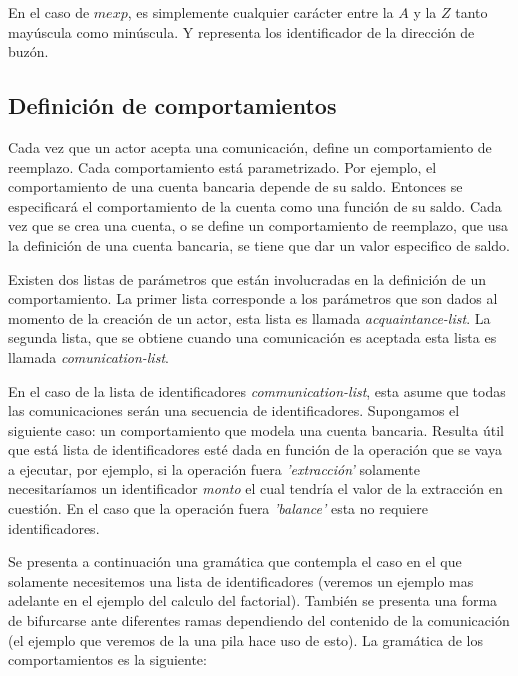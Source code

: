 En el caso de $mexp$, es simplemente cualquier carácter entre la $A$ y la $Z$ tanto mayúscula como minúscula. Y representa los identificador de la dirección de buzón.

\subsection{Definición de comportamientos}\label{actores:beha}
Cada vez que un actor acepta una comunicación, define un comportamiento de reemplazo. Cada comportamiento está parametrizado. Por ejemplo, el comportamiento de una cuenta bancaria depende de su saldo. Entonces se especificará el comportamiento de la cuenta como una función de su saldo. Cada vez que se crea una cuenta, o se define un comportamiento de reemplazo, que usa la definición de una cuenta bancaria, se tiene que dar un valor especifico de saldo.

Existen dos listas de parámetros que están involucradas en la definición de un comportamiento. La primer lista corresponde a los parámetros que son dados al momento de la creación de un actor, esta lista es llamada \textit{acquaintance-list}. La segunda lista, que se obtiene cuando una comunicación es aceptada esta lista es llamada \textit{comunication-list}.

En el caso de la lista de identificadores \textit{communication-list}, esta asume que todas las comunicaciones serán una secuencia de identificadores. Supongamos el siguiente caso: un comportamiento que modela una cuenta bancaria. Resulta útil que está lista de identificadores esté dada en función de la operación que se vaya a ejecutar, por ejemplo, si la operación fuera \textit{'extracción'} solamente necesitaríamos un identificador \textit{monto} el cual tendría el valor de la extracción en cuestión. En el caso que la operación fuera \textit{'balance'} esta no requiere identificadores. 

Se presenta a continuación una gramática que contempla el caso en el que solamente necesitemos una lista de identificadores (veremos un ejemplo mas adelante en el ejemplo del calculo del factorial). También se presenta una forma de bifurcarse ante diferentes ramas dependiendo del contenido de la comunicación (el ejemplo que veremos de la una pila hace uso de esto). La gramática de los comportamientos es la siguiente:

